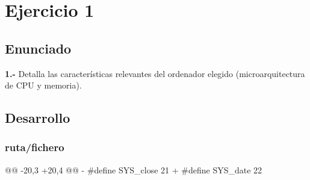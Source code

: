 \section{Ejercicio 1}
\subsection{Enunciado}
\begin{ejer}
    \textbf{1.-} Detalla las características relevantes del ordenador elegido (microarquitectura de CPU y memoria).
\end{ejer}
\subsection{Desarrollo}

\subsubsection{ruta/fichero}
\begin{listing}
@@ -20,3 +20,4 @@
-   #define SYS_close  21
+   #define SYS_date   22
\end{listing}

